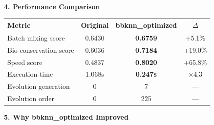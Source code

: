\documentclass[8pt]{article}
\begin{document}
\vspace{6pt}

{\large\bfseries 4. Performance Comparison}

\vspace{3pt}

\renewcommand{\arraystretch}{1.25}
\begin{table}[ht]
\centering
\small
\begin{tabular}{@{}l c c c@{}}
\toprule
\textbf{Metric} & \textbf{Original} & \textbf{bbknn\_optimized} & \textbf{$\Delta$} \\
\midrule
Batch mixing score & 0.6430 & \textbf{0.6759} & +5.1\% \\
Bio conservation score & 0.6036 & \textbf{0.7184} & +19.0\% \\
Speed score & 0.4837 & \textbf{0.8020} & +65.8\% \\
Execution time & 1.068s & \textbf{0.247s} & $\times$4.3 \\
\addlinespace
Evolution generation & 0 & 7 & --- \\
Evolution order & 0 & 225 & --- \\
\bottomrule
\end{tabular}
\end{table}

\vspace{6pt}

{\large\bfseries 5. Why bbknn\_optimized Improved}

\vspace{3pt}
\end{document}
